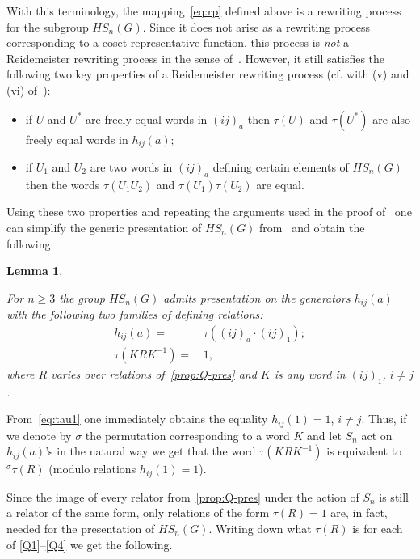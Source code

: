 \documentclass[oneside, 10pt]{amsart}
\theoremstyle{plain}
\numberwithin{equation}{section}
\newtheorem{lemma}{Lemma}
\numberwithin{lemma}{section}
\theoremstyle{remark}
\theoremstyle{definition}
\begin{document}
With this terminology, the mapping~\eqref{eq:rp} defined above is a rewriting process for the subgroup $HS_n(G)$.
Since it does not arise as a rewriting process corresponding to a coset representative function,
this process is {\it not} a Reidemeister rewriting process in the sense of~\cite[\S~2.3]{MKS76}.
However, it still satisfies the following two key properties of a Reidemeister rewriting process (cf. with (v) and (vi) of~\cite[\S~2.3]{MKS76}): 
\begin{itemize}
 \item if $U$ and $U^*$ are freely equal words in $(ij)_a$ then $\tau(U)$ and $\tau(U^*)$ are also freely equal words in $h_{ij}(a)$;
 \item if $U_1$ and $U_2$ are two words in $(ij)_a$ defining certain elements of $HS_n(G)$ then the words $\tau(U_1U_2)$ and $\tau(U_1) \tau(U_2)$ are equal.
\end{itemize}
Using these two properties and repeating the arguments used in the proof of~\cite[Theorem~2.8]{MKS76}
one can simplify the generic presentation of $HS_n(G)$ from~\cite[Theorem~2.6]{MKS76} and obtain the following.
\begin{lemma} \label{lm:h-gen}

 For $n\geq 3$ the group $HS_n(G)$ admits presentation on the generators $h_{ij}(a)$ with the following two families of defining relations:
 \begin{align}
  h_{ij}(a) = &\, \tau\left((ij)_a \cdot (ij)_1\right); \label{eq:tau1} \\
  \tau(KRK^{-1}) = &\, 1, \label{eq:tau2} 
 \end{align}  
 where $R$ varies over relations of~\cref{prop:Q-pres} and $K$ is any word in $(ij)_1$, $i\neq j$.
\end{lemma}

From~\eqref{eq:tau1} one immediately obtains the equality $h_{ij}(1)=1$, $i\neq j$.
Thus, if we denote by $\sigma$ the permutation corresponding to a word $K$ and let $S_n$ act on $h_{ij}(a)$'s in the natural way
 we get that the word $\tau(KRK^{-1})$ is equivalent to ${}^{\sigma}\tau(R)$ (modulo relations $h_{ij}(1)=1$). 

Since the image of every relator from~\cref{prop:Q-pres} under the action of $S_n$
 is still a relator of the same form, only relations of the form $\tau(R)=1$ are, in fact, 
 needed for the presentation of $HS_n(G)$.
Writing down what $\tau(R)$ is for each of \eqref{Q1}--\eqref{Q4} we get the following.
 
\end{document}
